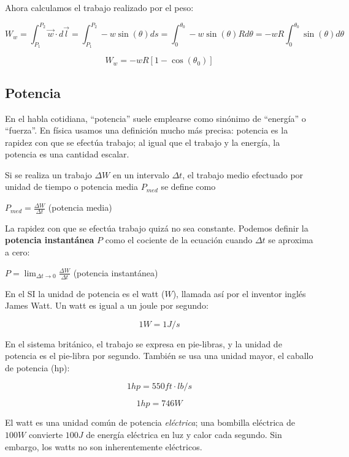 \documentclass{article}
\newcommand{\newsubsection}[1]{
    \vspace{0.5cm}
    \color{sectionColor}
    \subsection{ #1}
    \color{black}
    \vspace{0.5cm}
}
\newcommand{\bl}[1]{\textbf{#1}}
\newcommand{\definicion}[1]{%
    \vspace{0.5cm}
    \begin{definicionbox}
        #1
    \end{definicionbox}
    \vspace{0.5cm}
}
\begin{document}
    \par Ahora calculamos el trabajo realizado por el peso:

    \[ W_{w} = \int_{P_1}^{P_2} \vec{w} \cdot d\vec{l} = \int_{P_1}^{P_2} -w \sin(\theta) ds = \int_{0}^{\theta_0} -w \sin(\theta) R d\theta = -w R \int_{0}^{\theta_0} \sin(\theta) d\theta \]

    \[ W_{w} = -w R [ 1 - \cos(\theta_0) ] \]

    \newsubsection{Potencia}

    \par En el habla cotidiana, “potencia” suele emplearse como sinónimo de “energía” o “fuerza”. En física usamos una deﬁnición mucho más precisa: potencia es la rapidez con que se efectúa trabajo; al igual que el trabajo y la energía, la potencia es una cantidad escalar.

    \par Si se realiza un trabajo $\Delta W$ en un intervalo $\Delta t$, el trabajo medio efectuado por unidad de tiempo o potencia media $P_{med}$ se deﬁne como

    \definicion{
        \centering
        \( P_{med} = \frac{\Delta W}{\Delta t} \) \quad (potencia media)
    }

    \par La rapidez con que se efectúa trabajo quizá no sea constante. Podemos deﬁnir la \bl{potencia instantánea} $P$ como el cociente de la ecuación cuando $\Delta t$ se aproxima a cero:

    \definicion{
        \centering
        \( P = \lim_{\Delta t \to 0} \frac{\Delta W}{\Delta t} \) \quad (potencia instantánea)
    }

    \par En el SI la unidad de potencia es el watt ($W$), llamada así por el inventor inglés James Watt. Un watt es igual a un joule por segundo:

    \[ 1 W = 1 J/s \]

    \par En el sistema británico, el trabajo se expresa en pie-libras, y la unidad de potencia es el pie-libra por segundo. También se usa una unidad mayor, el caballo de potencia (hp):

    \[ 1 hp = 550 ft \cdot lb/s \]

    \[ 1 hp = 746 W \]

    \par El watt es una unidad común de potencia \textit{eléctrica}; una bombilla eléctrica de $100 W$ convierte $100 J$ de energía eléctrica en luz y calor cada segundo. Sin embargo, los watts no son inherentemente eléctricos.
\end{document}
